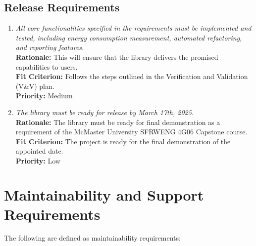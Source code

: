 \documentclass[12pt]{article}
\begin{document}
\subsection{Release Requirements}
\begin{enumerate}[label=OER-RL \arabic*., wide=0pt, leftmargin=*]
	\item \emph{All core functionalities specified in the requirements must be implemented and tested, including energy consumption measurement, automated refactoring, and reporting features.}\\[2mm]
    {\bf Rationale:} This will ensure that the library delivers the promised capabilities to users.\\
    {\bf Fit Criterion:} Follows the steps outlined in the Verification and Validation (V\&V) plan.  \\
    {\bf Priority:} Medium
  \item \emph{The library must be ready for release by March 17th, 2025.}\\[2mm]
    {\bf Rationale:} The library must be ready for final demonstration as a requirement of the McMaster University SFRWENG 4G06 Capstone course.\\
    {\bf Fit Criterion:} The project is ready for the final demonstration of the appointed date.\\
    {\bf Priority:} Low
\end{enumerate}

\section{Maintainability and Support Requirements}
The following are defined as maintainability requirements:
\end{document}
